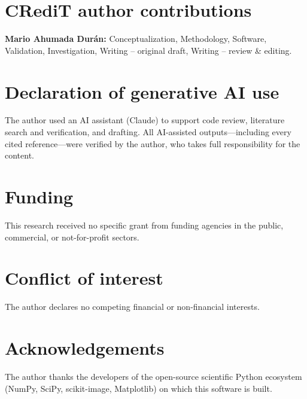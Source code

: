 \documentclass[review,3p]{elsarticle}
\begin{document}
\section*{CRediT author contributions}
\textbf{Mario Ahumada Dur\'{a}n:} Conceptualization, Methodology, Software,
Validation, Investigation, Writing -- original draft, Writing -- review \&
editing.

\section*{Declaration of generative AI use}
The author used an AI assistant (Claude) to support code review, literature
search and verification, and drafting. All AI-assisted outputs---including
every cited reference---were verified by the author, who takes full
responsibility for the content.

\section*{Funding}
This research received no specific grant from funding agencies in the
public, commercial, or not-for-profit sectors.

\section*{Conflict of interest}
The author declares no competing financial or non-financial interests.

\section*{Acknowledgements}
The author thanks the developers of the open-source scientific Python
ecosystem (NumPy, SciPy, scikit-image, Matplotlib) on which this software
is built.




\end{document}
